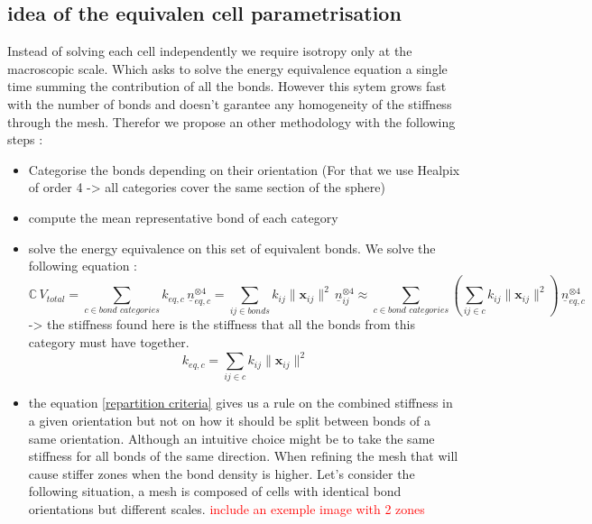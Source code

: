 \documentclass[10pt, onecolumn]{article}
\begin{document}
    \subsection{idea of the equivalen cell parametrisation}
    Instead of solving each cell independently we require isotropy only at the macroscopic scale. Which asks to solve the energy equivalence equation a single time summing the contribution of all the bonds. However this sytem grows fast with the number of bonds and doesn't garantee any homogeneity of the stiffness through the mesh. Therefor we propose an other methodology with the following steps :
    \begin{itemize}
        \item Categorise the bonds depending on their orientation (For that we use Healpix of order 4 -> all categories cover the same section of the sphere)
        \item compute the mean representative bond of each category
        \item solve the energy equivalence on this set of equivalent bonds. We solve the following equation :
        \begin{equation}
    \mathbb{C} \, V_{total} = \sum_{c \in \textit{bond categories}} k_{eq, c} \,
    \underline{n}_{eq, c}^{\otimes 4} = \sum_{ij \in \textit{bonds}} k_{ij} \|\mathbf{x}_{ij}\|^2 \,
    \underline{n}_{ij}^{\otimes 4} \approx \sum_{c \in \textit{bond categories}} \left( \sum_{ij \in \textit{c}} k_{ij} \|\mathbf{x}_{ij}\|^2 \right) \,
    \underline{n}_{eq, c}^{\otimes 4} 
    \label{equivalent cell energy match}
\end{equation}
        -> the stiffness found here is the stiffness that all the bonds from this category must have together.
        \begin{equation}
            k_{eq, c} = \sum_{ij \in \textit{c}} k_{ij} \|\mathbf{x}_{ij}\|^2
            \label{repartition criteria}
        \end{equation}
        \item the equation \eqref{repartition criteria} gives us a rule on the combined stiffness in a given orientation but not on how it should be split between bonds of a same orientation. Although an intuitive choice might be to take the same stiffness for all bonds of the same direction. When refining the mesh that will cause stiffer zones when the bond density is higher. 
        Let's consider the following situation, a mesh is composed of cells with identical bond orientations but different scales. 
        \textcolor{red}{include an exemple image with 2 zones}

\end{itemize}
\end{document}
